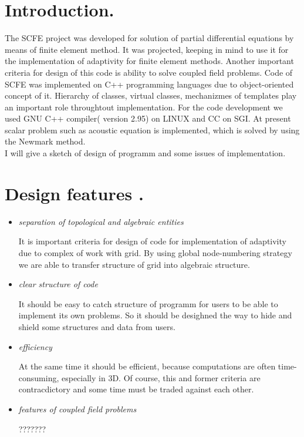 \section{Introduction.}
%
\begin{print}
 The SCFE project was developed for solution of partial differential equations by means of finite element method. It was projected, keeping in mind to use it for the implementation of adaptivity for finite element methods. Another important criteria for design of this code is ability to solve coupled field problems. Code of SCFE was implemented on C++ programming languages due to object-oriented concept of it. Hierarchy of classes, virtual classes, mechanizmes of templates play an important role throughtout implementation. For the code development we used GNU C++ compiler( version 2.95)  on LINUX and CC on SGI. At present scalar problem such as acoustic equation is implemented, which is solved by using the Newmark method.\\
 I will give a sketch of design of programm and some issues of implementation. 
\end{print}
%
\newslide
\newpage
%
\section{ Design features .}
\begin{itemize}
%
\item{\em separation of topological and algebraic entities}\\
%
\begin{print}
 It is important criteria for design of code for implementation of adaptivity due to complex of work with grid. By using global node-numbering strategy we are able to transfer structure of grid into algebraic structure.
\end{print}
%
\item{\em clear structure of code}\\
\begin{print}
 It should be easy to catch structure of programm for users to be able to implement its own problems. So it should be desighned the way to hide and shield some structures and data from users.
\end{print}
%
\item{\em efficiency}\\
\begin{print}
 At the same time it should be efficient, because computations are often time-consuming, especially in 3D. Of course, this and former criteria are contracdictory and some time must be traded against each other.
\end{print}
%
\item{ \em features of coupled field problems }\\
\begin{print}
 ???????
\end{print}
\end{itemize}
%
\newslide
%
